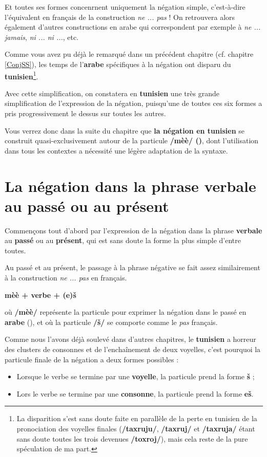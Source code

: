 Et toutes ses formes concenrnent uniquement la négation simple, c'est-à-dire l'équivalent en français de la construction \textit{ne ... pas} ! On retrouvera alors également d'autres constructions en arabe qui correspondent par exemple à \textit{ne ... jamais}, \textit{ni ... ni ...}, etc.

Comme vous avez pu déjà le remarqué dans un précédent chapitre (cf. chapitre \ref{ConjSS}), les temps de l'\textbf{arabe} spécifiques à la négation ont disparu du \textbf{tunisien}\footnote{La disparition s'est sans doute faite en parallèle de la perte en tunisien de la pronociation des voyelles finales (\textbf{/taxruju/}, \textbf{/taxruj/} et \textbf{/taxruja/} étant sans doute toutes les trois devenues \textbf{/toxroj/}), mais cela reste de la pure spéculation de ma part.}. 

Avec cette simplification, on constatera en \textbf{tunisien} une très grande simplification de l'expression de la négation, puisqu'une de toutes ces six formes a pris progressivement le dessus sur toutes les autres.

Vous verrez donc dans la suite du chapitre que \textbf{la négation en tunisien} se construit quasi-exclusivement autour de la particule \textbf{/mèè/ ()}, dont \linebreak l'utilisation dans tous les contextes a nécessité une légère adaptation de la syntaxe.

\section{La négation dans la phrase verbale au passé ou au présent}
Commençons tout d'abord par l'expression de la négation dans la phrase \textbf{verbale} au \textbf{passé} ou au \textbf{présent}, qui est sans doute la forme la plus simple d'entre toutes. 

Au passé et au présent, le passage à la phrase négative se fait assez similairement à la construction \textit{ne ... pas} en français. 

\begin{center}
    \textbf{\Large mèè + verbe + (e)\v{s}}
\end{center}

où \textbf{/mèè/} représente la particule pour exprimer la négation dans le passé en \textbf{arabe} (), et où la particule \textbf{/\v{s}/} se comporte comme le \textit{pas} français.

Comme nous l'avons déjà soulevé dans d'autres chapitres, le \textbf{tunisien} a horreur des clusters de consonnes et de l'enchaînement de deux voyelles, c'est pourquoi la particule finale de la négation a deux formes possibles : 
\begin{itemize}
    \item Lorsque le verbe se termine par une \textbf{voyelle}, la particule prend la forme \textbf{\v{s}} ; 
    \item Lors le verbe se termine par une \textbf{consonne}, la particule prend la forme \textbf{e\v{s}}.
\end{itemize}

